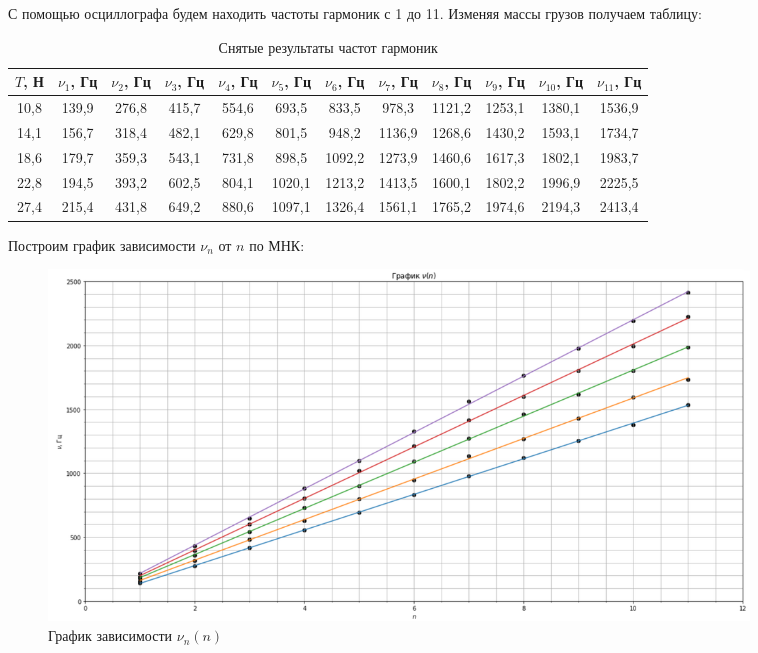 \documentclass[a4paper,12pt]{article}
\begin{document}
	С помощью осциллографа будем находить частоты гармоник с 1 до 11. Изменяя массы грузов получаем таблицу:
	\begin{table}[!h]
		\begin{center}
			\begin{tabular}{|c|c|c|c|c|c|c|c|c|c|c|c|}
				\hline
				$T$, Н& $\nu_1$, Гц &$\nu_2$, Гц& $\nu_3$, Гц& $\nu_4$, Гц& $\nu_5$, Гц& $\nu_6$, Гц &$\nu_7$, Гц& $\nu_8$, Гц& $\nu_9$, Гц& $\nu_{10}$, Гц & $\nu_{11}$, Гц\\
				\hline
				10,8 & 139,9 & 276,8 & 415,7 & 554,6 & 693,5 & 833,5 & 978,3 & 1121,2 & 1253,1 & 1380,1 & 1536,9 \\ 
				\hline
				14,1 & 156,7 & 318,4 & 482,1 & 629,8 & 801,5 & 948,2 & 1136,9 & 1268,6 & 1430,2 & 1593,1 & 1734,7 \\ 
				\hline
				18,6 & 179,7 & 359,3 & 543,1 & 731,8 & 898,5 & 1092,2 & 1273,9 & 1460,6 & 1617,3 & 1802,1 & 1983,7 \\
				\hline
				22,8 & 194,5 & 393,2 & 602,5 & 804,1 & 1020,1 & 1213,2 & 1413,5 & 1600,1 & 1802,2 & 1996,9 & 2225,5 \\ 
				\hline
				27,4 & 215,4 & 431,8 & 649,2 & 880,6 & 1097,1 & 1326,4 & 1561,1 & 1765,2 & 1974,6 & 2194,3 & 2413,4 \\ 
				\hline
			\end{tabular}
		\caption{Снятые результаты частот гармоник}
		\end{center}
	\end{table}

	Построим график зависимости $\nu_n$ от $n$ по МНК:
	
	\begin{figure}[h!]
		\begin{center}
			\includegraphics[width = 0.9\textwidth]{1.4.5 graph}
			\caption{График зависимости $\nu_n (n)$}
		\end{center}
	\end{figure}
	
\end{document}
